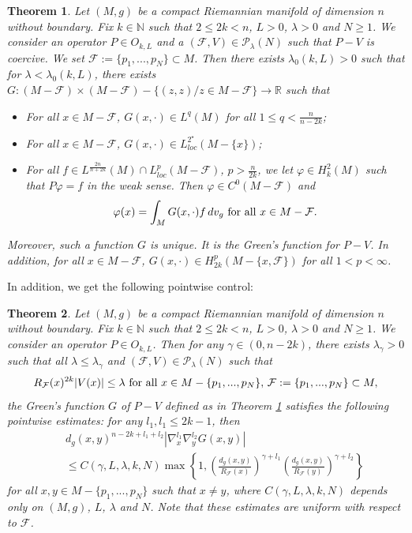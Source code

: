\documentclass[reqno]{amsart}
\newtheorem{theorem}{Theorem}[section]
\def \rr {\mathbb{R}}
\def \nn {\mathbb{N}}
\def \crit {2^\star}
\def \Pl {{\mathcal P}_\lambda}
\def \Mmx {M - \{p_1,...,p_N\}}
\def \F {{\mathcal F}}
\begin{document}
\begin{theorem}\label{th:Green:main} Let $(M,g)$ be a compact Riemannian manifold of dimension $n$ without boundary. Fix $k\in\nn$ such that $2\leq 2k<n$, $L>0$, $\lambda>0$ and  $N\geq 1$. We consider an operator $P\in O_{k,L}$ and a   $(\mathcal F,V)\in \Pl(N)$ such that $P-V$ is coercive. We set    ${\mathcal F}:=\{p_1,...,p_N\}\subset M$. Then there exists $\lambda_0(k,L)>0$ such that for $\lambda<\lambda_0(k,L)$, there exists $G:(M -  \F)\times (M -  \F) - \{(z,z)/z\in M -  \F\}\to \rr$ such that
\begin{itemize}
\item For all $x\in M -  \F$, $G(x,\cdot)\in L^q(M)$ for all $1\leq q<\frac{n}{n-2k}$;
\item For all $x\in M -  \F$, $G(x,\cdot)\in L^{\crit}_{loc}(M - \{x\})$;
\item For all $f\in L^{\frac{2n}{n+2k}}(M)\cap L^p_{loc}(M -  \F)$, $p>\frac{n}{2k}$, we let $\varphi\in H_k^2(M)$ such that $P\varphi=f$ in the weak sense. Then $\varphi\in C^0(M -  \F)$ and
$$\varphi(x)=\int_M  G(x,\cdot) f\, dv_g\hbox{ for all }x\in M -  \F.$$
\end{itemize}
Moreover, such a function $G$ is unique. It is the Green's function for $P-V$. In addition, for all $x\in M -  \F$, $G(x,\cdot)\in H_{2k}^p(M - \{x, \F\})$ for all $1<p<\infty$.
\end{theorem}
In addition, we get the following pointwise control:
\begin{theorem}\label{th:Green:pointwise:BIS} Let $(M,g)$ be a compact Riemannian manifold of dimension $n$ without boundary. Fix $k\in\nn$ such that $2\leq 2k<n$, $L>0$, $\lambda>0$ and   $N\geq 1$.  We consider an operator $P\in O_{k,L}$. Then for any $\gamma\in (0,n-2k)$, there exists $\lambda_\gamma>0$ such that all $\lambda\leq \lambda_\gamma$ and $(\F,V)\in \Pl(N)$ such that  
$$R_{\mathcal F}(x)^{2k}|V(x)|\leq \lambda\hbox{ for all }x\in \Mmx,\, \F:=\{p_1,...,p_N\}\subset M,$$
the Green's function $G$ of $P-V$ defined as in Theorem \ref{th:Green:main} satisfies the following pointwise estimates: for any $l_1, l_1\leq 2k-1$, then 
\begin{eqnarray}
&&d_g(x,y)^{n-2k+l_1+l_2}|\nabla_x^{l_1}\nabla_y^{l_2}G(x,y)|\nonumber\\
&&\leq C(\gamma,L,\lambda, k,N) \max\left\{1, \left(\frac{d_g(x,y)}{ R_{\mathcal F}(x) }\right)^{\gamma+l_1}\left(\frac{d_g(x,y)}{ R_{\mathcal F}(y) }\right)^{\gamma+l_2}\right\}\label{ineq:funda}
\end{eqnarray}
for all $x,y\in \Mmx$ such that $x\neq y$, where $C(\gamma,L,\lambda, k,N)$ depends only on $(M,g)$, $L$, $\lambda$ and $N$. Note that these estimates are uniform with respect to  $\mathcal F$.
\end{theorem}
\end{document}
